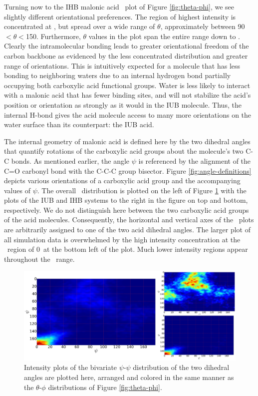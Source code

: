 Turning now to the IHB malonic acid \thetaphi~plot of Figure \ref{fig:theta-phi}, we see slightly different orientational preferences. The region of highest intensity is concentrated at \degr, but spread over a wide range of $\theta$, approximately between 90\degr $< \theta <$150\degr. Furthermore, $\theta$ values in the plot span the entire range down to \degr. Clearly the intramolecular bonding leads to greater orientational freedom of the carbon backbone as evidenced by the less concentrated distribution and greater range of orientations. This is intuitively expected for a molecule that has less bonding to neighboring waters due to an internal hydrogen bond partially occupying both carboxylic acid functional groups. Water is less likely to interact with a malonic acid that has fewer binding sites, and will not stabilize the acid's position or orientation as strongly as it would in the IUB molecule. Thus, the internal H-bond gives the acid molecule access to many more orientations on the water surface than its counterpart: the IUB acid.

The internal geometry of malonic acid is defined here by the two dihedral angles that quantify rotations of the carboxylic acid groups about the molecule's two C-C bonds. As mentioned earlier, the angle $\psi$ is referenced by the alignment of the C=O carbonyl bond with the C-C-C group bisector. Figure \ref{fig:angle-definitions} depicts various orientations of a carboxylic acid group and the accompanying values of $\psi$. The overall \psipsi~distribution is plotted on the left of Figure \ref{fig:psi-psi} with the plots of the IUB and IHB systems to the right in the figure on top and bottom, respectively. We do not distinguish here between the two carboxylic acid groups of the acid molecules. Consequently, the horizontal and vertical axes of the \psipsi~plots are arbitrarily assigned to one of the two acid dihedral angles. The larger plot of all simulation data is overwhelmed by the high intensity concentration at the \psipsi~region of 0\degr~at the bottom left of the plot. Much lower intensity regions appear throughout the \psipsi~range.


\begin{figure}[h!]
	\begin{center}
		\includegraphics[scale=1.0]{images/orientation/psi-psi.png}
		\caption{Intensity plots of the bivariate $\psi$-$\psi$ distribution of the two dihedral angles are plotted here, arranged and colored in the same manner as the $\theta$-$\phi$ distributions of Figure \ref{fig:theta-phi}.} 
		\label{fig:psi-psi}
	\end{center}
\end{figure}

